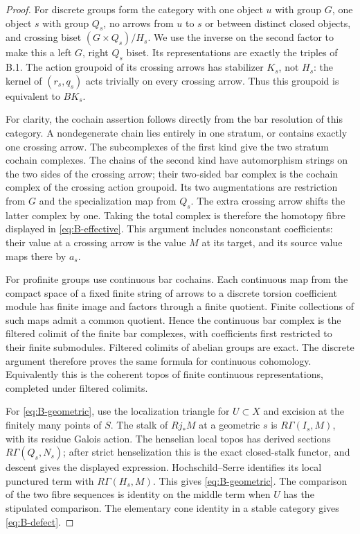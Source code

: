 \begin{proof}
For discrete groups form the category with one object $u$ with group
$G$, one object $s$ with group $Q_s$, no arrows from $u$ to $s$ or
between distinct closed objects, and crossing biset
$(G\times Q_s)/H_s$. We use the inverse on the second factor to make
this a left $G$, right $Q_s$ biset. Its representations are exactly
the triples of B.1. The action groupoid of its crossing arrows has
stabilizer $K_s$, not $H_s$: the kernel of $(r_s,q_s)$ acts trivially
on every crossing arrow. Thus this groupoid is equivalent to $BK_s$.

For clarity, the cochain assertion follows directly from the bar
resolution of this category. A nondegenerate chain lies entirely in
one stratum, or contains exactly one crossing arrow. The subcomplexes
of the first kind give the two stratum cochain complexes. The chains
of the second kind have automorphism strings on the two sides of the
crossing arrow; their two-sided bar complex is the cochain complex of
the crossing action groupoid. Its two augmentations are restriction
from $G$ and the specialization map from $Q_s$. The extra crossing
arrow shifts the latter complex by one. Taking the total complex is
therefore the homotopy fibre displayed in \eqref{eq:B-effective}.
This argument includes nonconstant coefficients: their value at a
crossing arrow is the value $M$ at its target, and its source value
maps there by $a_s$.

For profinite groups use continuous bar cochains. Each continuous map
from the compact space of a fixed finite string of arrows to a
discrete torsion coefficient module has finite image and factors
through a finite quotient. Finite collections of such maps admit a
common quotient. Hence the continuous bar complex is the filtered
colimit of the finite bar complexes, with coefficients first restricted
to their finite submodules. Filtered colimits of abelian groups are
exact. The discrete argument therefore proves the same formula for
continuous cohomology. Equivalently this is the coherent topos of
finite continuous representations, completed under filtered colimits.

For \eqref{eq:B-geometric}, use the localization triangle for $U\subset X$
and excision at the finitely many points of $S$. The stalk of
$Rj_*M$ at a geometric $s$ is $R\Gamma(I_s,M)$, with its residue
Galois action. The henselian local topos has derived sections
$R\Gamma(Q_s,N_s)$; after strict henselization this is the exact
closed-stalk functor, and descent gives the displayed expression.
Hochschild--Serre identifies its local punctured term with
$R\Gamma(H_s,M)$. This gives \eqref{eq:B-geometric}. The comparison
of the two fibre sequences is identity on the middle term when $U$
has the stipulated comparison. The elementary cone identity in a
stable category gives \eqref{eq:B-defect}.
\end{proof}

